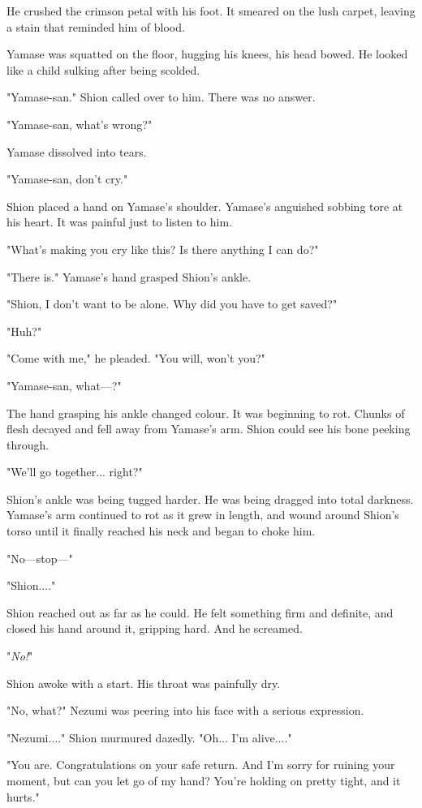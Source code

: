 He crushed the crimson petal with his foot. It smeared on the lush
carpet, leaving a stain that reminded him of blood.

\mybreak

Yamase was squatted on the floor, hugging his knees, his head bowed. He
looked like a child sulking after being scolded.

"Yamase-san." Shion called over to him. There was no answer.

"Yamase-san, what's wrong?"

Yamase dissolved into tears.

"Yamase-san, don't cry."

Shion placed a hand on Yamase's shoulder. Yamase's anguished sobbing
tore at his heart. It was painful just to listen to him.

"What's making you cry like this? Is there anything I can do?"

"There is." Yamase's hand grasped Shion's ankle.

"Shion, I don't want to be alone. Why did you have to get saved?"

"Huh?"

"Come with me," he pleaded. "You will, won't you?"

"Yamase-san, what---?"

The hand grasping his ankle changed colour. It was beginning to rot.
Chunks of flesh decayed and fell away from Yamase's arm. Shion could see
his bone peeking through.

"We'll go together... right?"

Shion's ankle was being tugged harder. He was being dragged into total
darkness. Yamase's arm continued to rot as it grew in length, and wound
around Shion's torso until it finally reached his neck and began to
choke him.

"No---stop---"

"Shion...."

Shion reached out as far as he could. He felt something firm and
definite, and closed his hand around it, gripping hard. And he screamed.

"\emph{No!}"

Shion awoke with a start. His throat was painfully dry.

"No, what?" Nezumi was peering into his face with a serious expression.

"Nezumi...." Shion murmured dazedly. "Oh... I'm alive...."

"You are. Congratulations on your safe return. And I'm sorry for ruining
your moment, but can you let go of my hand? You're holding on pretty
tight, and it hurts."

